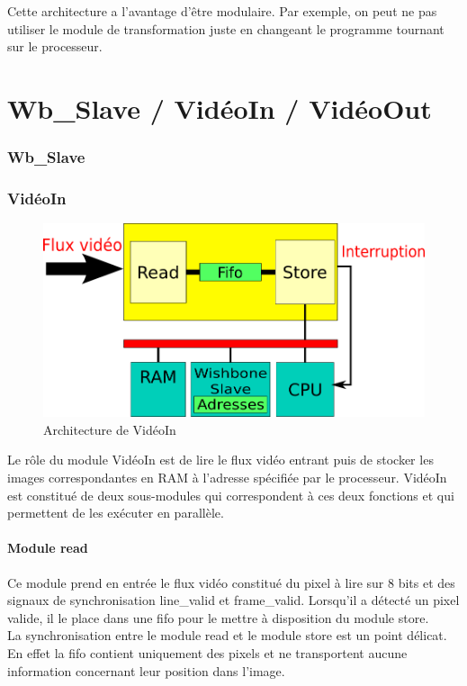{{Cette architecture a l'avantage d'être modulaire. Par exemple, on peut ne pas utiliser le module de transformation juste en changeant le programme tournant sur le processeur.
}





    \part{Wb\_Slave / VidéoIn / VidéoOut}
    \section{Wb\_Slave}


    \section{VidéoIn}

\begin{figure}[!h]
	\centering
	\includegraphics[scale = 0.5]{video_in.png}
	\caption{Architecture de VidéoIn}
\end{figure}

Le rôle du module VidéoIn est de lire le flux vidéo entrant puis de stocker les images correspondantes en RAM à l'adresse spécifiée par le processeur.
VidéoIn est constitué de deux sous-modules qui correspondent à ces deux fonctions et qui permettent de les exécuter en parallèle. 


\subsection{Module read}
Ce module prend en entrée le flux vidéo constitué du pixel à lire sur 8 bits et des signaux de synchronisation line\_valid et frame\_valid.
Lorsqu'il a détecté un pixel valide, il le place dans une fifo pour le mettre à disposition du module store.\\
La synchronisation entre le module read et le module store est un point délicat. 
En effet la fifo contient uniquement des pixels et ne transportent aucune information concernant leur position dans l'image. 

}
